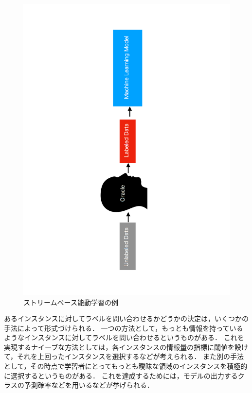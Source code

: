 \documentclass[11pt]{report}
\begin{document}
\begin{figure}[h]
\begin{center}
\includegraphics[bb=100 0 350 850, scale=0.4, angle=270]{./images/fig2.pdf}
\vspace{2mm}
\caption{ストリームベース能動学習の例}
\label{fig2}
\end{center}
\end{figure}

あるインスタンスに対してラベルを問い合わせるかどうかの決定は，いくつかの手法によって形式づけられる．
一つの方法として，もっとも情報を持っているようなインスタンスに対してラベルを問い合わせるというものがある\cite{dagan1995committee}．
これを実現するナイーブな方法としては，各インスタンスの情報量の指標に閾値を設けて，それを上回ったインスタンスを選択するなどが考えられる．
また別の手法として，その時点で学習者にとってもっとも曖昧な領域のインスタンスを積極的に選択するというものがある\cite{cohn1994improving}．
これを達成するためには，モデルの出力するクラスの予測確率などを用いるなどが挙げられる．
\end{document}

